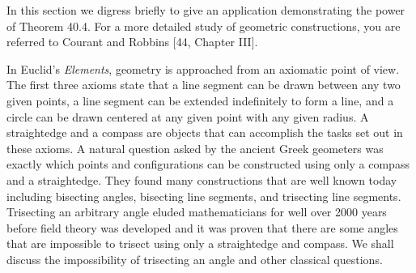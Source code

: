 \documentclass[11pt,oneside]{article}
\begin{document}
\fi
\renewcommand{\BookFooter}{Section 41 Geometric Constructions}
\ifdefined\BookMaster\else\setcounter{page}{328}\fi
\BookNarrativetrue

\begin{BookBody}


\noindent In this section we digress briefly to give an application demonstrating the power of Theorem 40.4. For a more detailed study of geometric constructions, you are referred to Courant and Robbins [44, Chapter III].

In Euclid’s\textit{ Elements}, geometry is approached from an axiomatic point of view. The first three axioms state that a line segment can be drawn between any two given points, 
a line segment can be extended indefinitely to form a line, and a circle can be drawn centered at any given point with any given radius. A straightedge and a compass are objects that can accomplish the tasks set out in these axioms. A natural question asked by the ancient Greek geometers was exactly which points and configurations can be constructed using only a compass and a straightedge. They found many constructions that are well known today including bisecting angles, bisecting line segments, and trisecting line segments. Trisecting an arbitrary angle eluded mathematicians for well over 2000 years before field theory was developed and it was proven that there are some angles that are impossible to trisect using only a straightedge and compass. We shall discuss the impossibility of trisecting an angle and other classical questions.

\end{BookBody}

\BookNarrativetrue
\end{document}
